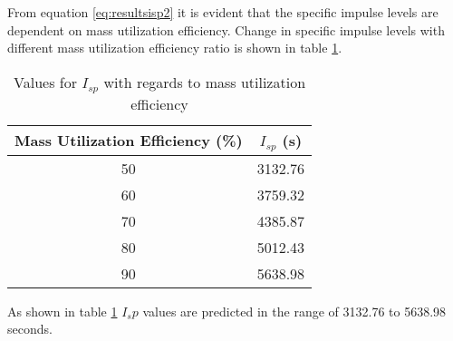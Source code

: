 From equation \ref{eq:resultsisp2} it is evident that the specific impulse levels are dependent on mass utilization efficiency. Change in specific impulse levels with different mass utilization efficiency ratio is shown in table \ref{table:resultsispchart}.

\begin{table}
    \centering
    \begin{tabular}{||c|c||}
        \hline
        Mass Utilization Efficiency (\%) & $I_{sp}$ (s) \\
        \hline
        50 & 3132.76 \\
        \hline
        60 & 3759.32 \\
        \hline
        70 & 4385.87 \\
        \hline
        80 & 5012.43 \\
        \hline
        90 & 5638.98 \\
        \hline
        \end{tabular}
        \caption{Values for $I_{sp}$ with regards to mass utilization efficiency}
        \label{table:resultsispchart}
\end{table}

As shown in table \ref{table:resultsispchart} $I_sp$ values are predicted in the range of 3132.76 to 5638.98 seconds.

\newpage






